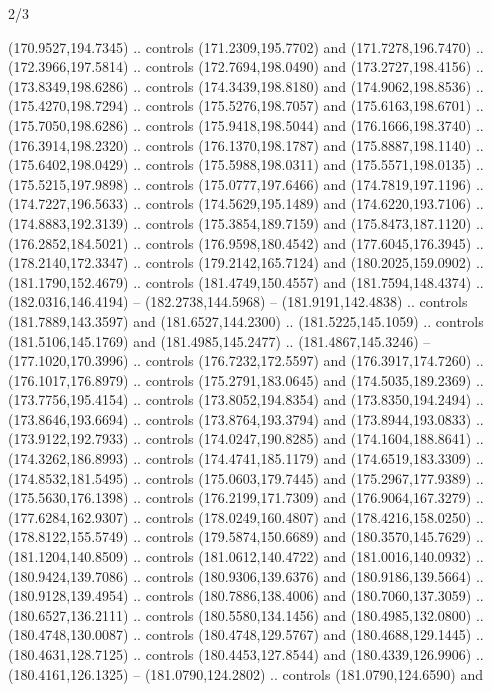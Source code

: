 \begin{flagdescription}{2/3}
\begin{scope}[shift={(0.5\flaglength,0.5)},scale=\flagwidth/320]
\begin{scope}[y=0.8pt, x=0.8pt, yscale=-1,shift={(-118.3,-146)}]
  (170.9527,194.7345) .. controls (171.2309,195.7702) and (171.7278,196.7470) ..
  (172.3966,197.5814) .. controls (172.7694,198.0490) and (173.2727,198.4156) ..
  (173.8349,198.6286) .. controls (174.3439,198.8180) and (174.9062,198.8536) ..
  (175.4270,198.7294) .. controls (175.5276,198.7057) and (175.6163,198.6701) ..
  (175.7050,198.6286) .. controls (175.9418,198.5044) and (176.1666,198.3740) ..
  (176.3914,198.2320) .. controls (176.1370,198.1787) and (175.8887,198.1140) ..
  (175.6402,198.0429) .. controls (175.5988,198.0311) and (175.5571,198.0135) ..
  (175.5215,197.9898) .. controls (175.0777,197.6466) and (174.7819,197.1196) ..
  (174.7227,196.5633) .. controls (174.5629,195.1489) and (174.6220,193.7106) ..
  (174.8883,192.3139) .. controls (175.3854,189.7159) and (175.8473,187.1120) ..
  (176.2852,184.5021) .. controls (176.9598,180.4542) and (177.6045,176.3945) ..
  (178.2140,172.3347) .. controls (179.2142,165.7124) and (180.2025,159.0902) ..
  (181.1790,152.4679) .. controls (181.4749,150.4557) and (181.7594,148.4374) ..
  (182.0316,146.4194) -- (182.2738,144.5968) -- (181.9191,142.4838) .. controls
  (181.7889,143.3597) and (181.6527,144.2300) .. (181.5225,145.1059) .. controls
  (181.5106,145.1769) and (181.4985,145.2477) .. (181.4867,145.3246) --
  (177.1020,170.3996) .. controls (176.7232,172.5597) and (176.3917,174.7260) ..
  (176.1017,176.8979) .. controls (175.2791,183.0645) and (174.5035,189.2369) ..
  (173.7756,195.4154) .. controls (173.8052,194.8354) and (173.8350,194.2494) ..
  (173.8646,193.6694) .. controls (173.8764,193.3794) and (173.8944,193.0833) ..
  (173.9122,192.7933) .. controls (174.0247,190.8285) and (174.1604,188.8641) ..
  (174.3262,186.8993) .. controls (174.4741,185.1179) and (174.6519,183.3309) ..
  (174.8532,181.5495) .. controls (175.0603,179.7445) and (175.2967,177.9389) ..
  (175.5630,176.1398) .. controls (176.2199,171.7309) and (176.9064,167.3279) ..
  (177.6284,162.9307) .. controls (178.0249,160.4807) and (178.4216,158.0250) ..
  (178.8122,155.5749) .. controls (179.5874,150.6689) and (180.3570,145.7629) ..
  (181.1204,140.8509) .. controls (181.0612,140.4722) and (181.0016,140.0932) ..
  (180.9424,139.7086) .. controls (180.9306,139.6376) and (180.9186,139.5664) ..
  (180.9128,139.4954) .. controls (180.7886,138.4006) and (180.7060,137.3059) ..
  (180.6527,136.2111) .. controls (180.5580,134.1456) and (180.4985,132.0800) ..
  (180.4748,130.0087) .. controls (180.4748,129.5767) and (180.4688,129.1445) ..
  (180.4631,128.7125) .. controls (180.4453,127.8544) and (180.4339,126.9906) ..
  (180.4161,126.1325) -- (181.0790,124.2802) .. controls (181.0790,124.6590) and

\end{scope}
\end{scope}
\end{flagdescription}
